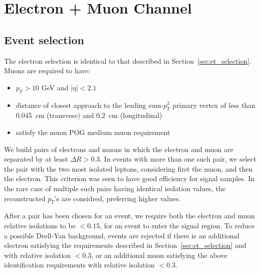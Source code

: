\chapter{Electron + Muon Channel}\label{sec:eMu}

\section{Event selection}\label{sec:em_selection}


The electron selection is identical to that described in
Section~\ref{sec:et_selection}.  Muons are required to have:
\begin{itemize}
  \item $p_{T} > 10$ GeV and $\vert \eta \vert < 2.1$
  \item distance of closest approach to the leading sum-$p_T^2$ 
    primary vertex of less than 0.045~cm (transvese) and 0.2~cm (longitudinal)
  \item satisfy the muon POG medium muon requirement
\end{itemize}

We build pairs of electrons and muons in which the electron and muon
are separated by at least $\Delta R > 0.3$.  In events with more than
one such pair, we select the pair with the two most isolated leptons,
considering first the muon, and then the electron.  This criterion was
seen to have good efficiency for signal samples.  In the rare case of
multiple such pairs having identical isolation values, the
reconstructed $p_T$'s are considred, preferring higher values.

After a pair has been chosen for an event, we require both the
electron and muon relative isolations to be $<0.15$, for an event to
enter the signal region.  To reduce a possible Drell-Yan background,
events are rejected if there is an additional electron satisfying the
requirements described in Section~\ref{sec:et_selection} and with
relative isolation $<0.3$, or an additional muon satisfying the above
identification requirements with relative isolation $<0.3$.


